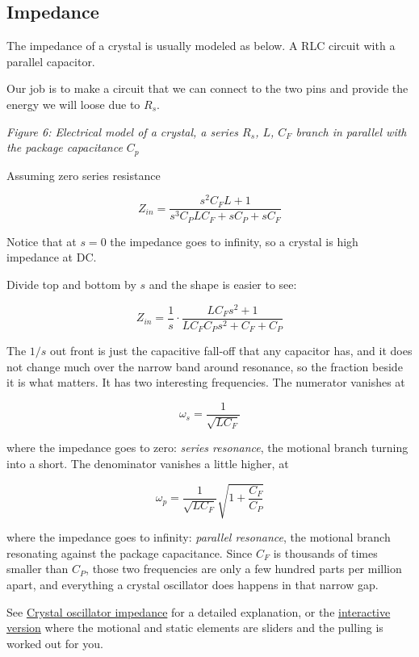 \subsection{Impedance}\label{impedance}

The impedance of a crystal is usually modeled as below. A RLC circuit
with a parallel capacitor.

Our job is to make a circuit that we can connect to the two pins and
provide the energy we will loose due to \(R_s\).


{
\centering
{}
}

\emph{Figure 6: Electrical model of a crystal, a series \(R_s\), \(L\),
\(C_F\) branch in parallel with the package capacitance \(C_p\)}

Assuming zero series resistance

\[ Z_{in} = \frac{s^2 C_F L + 1}{s^3 C_P L C_F + s C_P + s C_F}\]

Notice that at \(s=0\) the impedance goes to infinity, so a crystal is
high impedance at DC.

Divide top and bottom by \(s\) and the shape is easier to see:

\[ Z_{in} = \frac{1}{s}\cdot\frac{L C_F s^2 + 1}{L C_F C_P s^2 + C_F + C_P}\]

The \(1/s\) out front is just the capacitive fall-off that any capacitor
has, and it does not change much over the narrow band around resonance,
so the fraction beside it is what matters. It has two interesting
frequencies. The numerator vanishes at

\[ \omega_s = \frac{1}{\sqrt{LC_F}} \]

where the impedance goes to zero: \emph{series resonance}, the motional
branch turning into a short. The denominator vanishes a little higher,
at

\[ \omega_p = \frac{1}{\sqrt{LC_F}}\sqrt{1 + \frac{C_F}{C_P}} \]

where the impedance goes to infinity: \emph{parallel resonance}, the
motional branch resonating against the package capacitance. Since
\(C_F\) is thousands of times smaller than \(C_P\), those two
frequencies are only a few hundred parts per million apart, and
everything a crystal oscillator does happens in that narrow gap.

See
\href{https://github.com/wulffern/aic2026/blob/main/jupyter/xosc.ipynb}{Crystal
oscillator impedance} for a detailed explanation, or the
\href{https://wulffern.github.io/aic2026/assets/examples/xosc.html}{interactive
version} where the motional and static elements are sliders and the
pulling is worked out for you.

